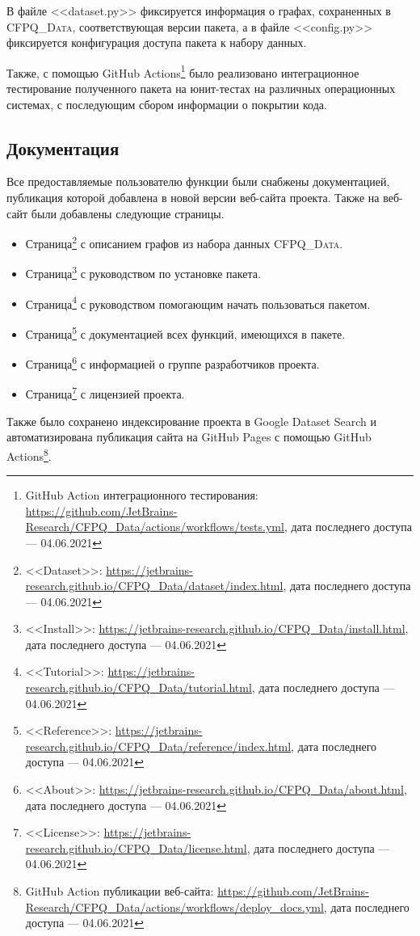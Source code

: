 В файле <<dataset.py>> фиксируется информация о графах, сохраненных в \textsc{CFPQ\_Data}, соответствующая версии пакета, а в файле <<config.py>> фиксируется конфигурация доступа пакета к набору данных.

Также, с помощью GitHub Actions\footnote{GitHub Action интеграционного тестирования: \url{https://github.com/JetBrains-Research/CFPQ_Data/actions/workflows/tests.yml}, дата последнего доступа --- 04.06.2021} было реализовано интеграционное тестирование полученного пакета на юнит-тестах на различных операционных системах, с последующим сбором информации о покрытии кода.

\subsection{Документация}
Все предоставляемые пользователю функции были снабжены документацией, публикация которой добавлена в новой версии веб-сайта проекта.
Также на веб-сайт были добавлены следующие страницы.
\begin{itemize}
    \item Страница\footnote{<<Dataset>>: \url{https://jetbrains-research.github.io/CFPQ_Data/dataset/index.html}, дата последнего доступа --- 04.06.2021} с описанием графов из набора данных \textsc{CFPQ\_Data}.
    \item Страница\footnote{<<Install>>: \url{https://jetbrains-research.github.io/CFPQ_Data/install.html}, дата последнего доступа --- 04.06.2021} с руководством по установке пакета.
    \item Страница\footnote{<<Tutorial>>: \url{https://jetbrains-research.github.io/CFPQ_Data/tutorial.html}, дата последнего доступа --- 04.06.2021} с руководством помогающим начать пользоваться пакетом.
    \item Страница\footnote{<<Reference>>: \url{https://jetbrains-research.github.io/CFPQ_Data/reference/index.html}, дата последнего доступа --- 04.06.2021} с документацией всех функций, имеющихся в пакете.
    \item Страница\footnote{<<About>>: \url{https://jetbrains-research.github.io/CFPQ_Data/about.html}, дата последнего доступа --- 04.06.2021} с информацией о группе разработчиков проекта.
    \item Страница\footnote{<<License>>: \url{https://jetbrains-research.github.io/CFPQ_Data/license.html}, дата последнего доступа --- 04.06.2021} с лицензией проекта.
\end{itemize}

Также было сохранено индексирование проекта в Google Dataset Search и автоматизирована публикация сайта на GitHub Pages с помощью GitHub Actions\footnote{GitHub Action публикации веб-сайта: \url{https://github.com/JetBrains-Research/CFPQ_Data/actions/workflows/deploy_docs.yml}, дата последнего доступа --- 04.06.2021}.